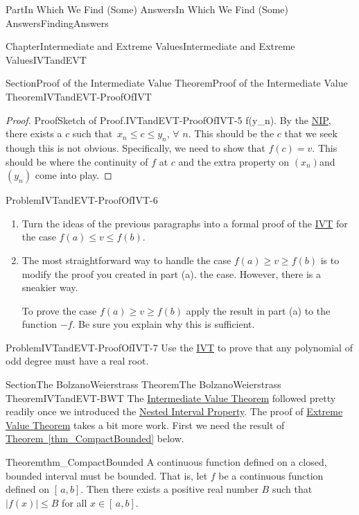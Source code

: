 \documentclass[oneside,10pt,]{book}
\newcommand{\xreffont}{\relax}
\numberwithin{equation}{part}
\begin{document}
\begin{partptx}{Part}{In Which We Find (Some) Answers}{}{In Which We Find (Some) Answers}{}{}{FindingAnswers}
\begin{chapterptx}{Chapter}{Intermediate and Extreme Values}{}{Intermediate and Extreme Values}{}{}{IVTandEVT}
\begin{sectionptx}{Section}{Proof of the Intermediate Value Theorem}{}{Proof of the Intermediate Value Theorem}{}{}{IVTandEVT-ProofOfIVT}
\begin{proof}{Proof}{Sketch of Proof.}{IVTandEVT-ProofOfIVT-5}
f(y_n)\).  By the \hyperref[NIP]{NIP}, there exists a \(c\) such that \(\,x_n\leq c\leq y_n\), \(\forall\) \(n\).  This should be the \(c\) that we seek though this is not obvious.  Specifically, we need to show that \(f(c)=v\). This should be where the continuity of \(f\) at \(c\) and the extra property on \(\left(x_n\right)\)and \(\left(y_n\right)\) come into play.%
\end{proof}
\begin{problem}{Problem}{}{IVTandEVT-ProofOfIVT-6}%
\begin{enumerate}[font=\bfseries,label=(\alph*),ref=\alph*]%
\item{}Turn the ideas of the previous paragraphs into a formal proof of the \hyperref[IntermediateValueTheorem]{IVT} for the case \(f(a)\leq v\leq
f(b)\).%
\item{}The most straightforward way to handle the case \(f(a)\geq
v\geq f(b)\) is to modify the proof you created in part (a).  the case.  However, there is a sneakier way.%
\par
To prove the case \(f(a)\geq v\geq f(b)\) apply the result in part (a) to the function \(-f\). Be sure you explain why this is sufficient.%
\end{enumerate}%
\end{problem}
\begin{problem}{Problem}{}{IVTandEVT-ProofOfIVT-7}%
Use the \hyperref[IntermediateValueTheorem]{IVT} to prove that any polynomial of odd degree must have a real root.%
\end{problem}
\end{sectionptx}
%
%
\typeout{************************************************}
\typeout{************************************************}
%
\begin{sectionptx}{Section}{The Bolzano\textendash{}Weierstrass Theorem}{}{The Bolzano\textendash{}Weierstrass Theorem}{}{}{IVTandEVT-BWT}
The \hyperref[IntermediateValueTheorem]{Intermediate Value Theorem} followed pretty readily once we introduced the \hyperref[NIP]{Nested Interval Property}.  The proof of \hyperref[thm_EVT]{Extreme Value Theorem} takes a bit more work.  First we need the result of \hyperref[thm_CompactBounded]{Theorem~{\xreffont\ref{thm_CompactBounded}}} below.%
\begin{theorem}{Theorem}{}{}{thm_CompactBounded}%
%
A continuous function defined on a closed, bounded interval must be bounded.  That is, let \(f\) be a continuous function defined on \([\,a,b]\).  Then there exists a positive real number \(B\) such that \(|f(x)|\leq B\) for all \(x\in[\,a,b]\).%

\end{theorem}
\end{sectionptx}
\end{chapterptx}
\end{partptx}
\end{document}
